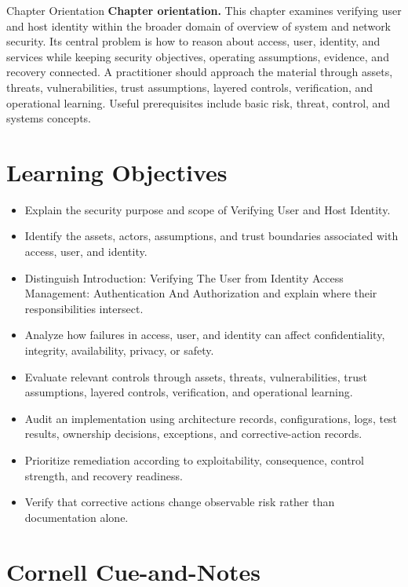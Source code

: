\documentclass[11pt,letterpaper]{article}
\title{\CornellDocumentTitle}
\author{}
\date{}
\begin{document}
\maketitle
\begin{CornellOverviewBox}{Chapter Orientation}
\textbf{Chapter orientation.} This chapter examines verifying user and host identity within the broader domain of overview of system and network security. Its central problem is how to reason about access, user, identity, and services while keeping security objectives, operating assumptions, evidence, and recovery connected. A practitioner should approach the material through assets, threats, vulnerabilities, trust assumptions, layered controls, verification, and operational learning. Useful prerequisites include basic risk, threat, control, and systems concepts.
\end{CornellOverviewBox}
\section*{Learning Objectives}
\begin{itemize}
\item Explain the security purpose and scope of Verifying User and Host Identity.
\item Identify the assets, actors, assumptions, and trust boundaries associated with access, user, and identity.
\item Distinguish Introduction: Verifying The User from Identity Access Management: Authentication And Authorization and explain where their responsibilities intersect.
\item Analyze how failures in access, user, and identity can affect confidentiality, integrity, availability, privacy, or safety.
\item Evaluate relevant controls through assets, threats, vulnerabilities, trust assumptions, layered controls, verification, and operational learning.
\item Audit an implementation using architecture records, configurations, logs, test results, ownership decisions, exceptions, and corrective-action records.
\item Prioritize remediation according to exploitability, consequence, control strength, and recovery readiness.
\item Verify that corrective actions change observable risk rather than documentation alone.
\end{itemize}
\section*{Cornell Cue-and-Notes}
\end{document}

